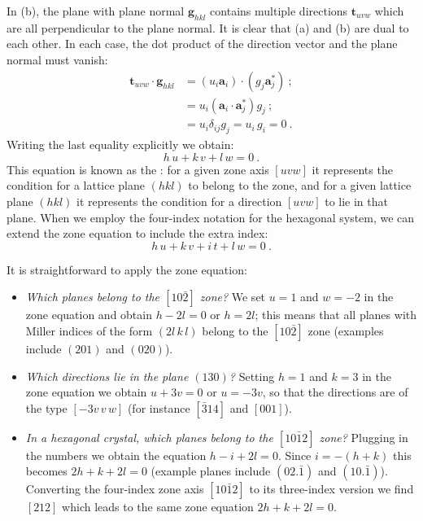 In (b), the plane with plane normal $\mathbf{g}_{hkl}$ contains multiple directions $\mathbf{t}_{uvw}$ which are all perpendicular to the plane normal. It is clear that (a) and (b) are dual to each other.  In each case, the dot product of the direction vector and the plane normal must vanish:
\begin{equation*}
\begin{split}
	\mathbf{t}_{uvw}\cdot\mathbf{g}_{hkl} &= (u_i\mathbf{a}_i)\cdot(g_j\mathbf{a}^{\ast}_j)\ ;\\
	&= u_i(\mathbf{a}_i\cdot\mathbf{a}^{\ast}_j)g_j\ ;\\
	&= u_i\delta_{ij}g_j = u_i\,g_i = 0\ .
\end{split}
\end{equation*}
Writing the last equality explicitly we obtain:
\begin{equation}
	h\,u+k\,v+l\,w=0\ .\label{\chabbr:eq:zoneeq}
\end{equation}
This equation is known as the : for a given zone axis $[uvw]$ it represents the condition for a lattice plane $(hkl)$ to belong to the zone, and for a given lattice plane $(hkl)$ it represents the condition for a direction $[uvw]$ to lie in that plane.  When we employ the four-index notation for the hexagonal system, we can extend the zone equation to include the extra index:
\begin{equation}
	h\,u+k\,v+i\, t + l\,w=0\ .\label{\chabbr:eq:zoneeqhex}
\end{equation}

\noindent It is straightforward to apply the zone equation:
\begin{itemize}
	\item \textit{Which planes belong to the $[10\bar{2}]$ zone?} We set $u=1$ and $w=-2$ in the zone equation and obtain $h-2l=0$ or $h=2l$; this means that all planes with Miller indices of the form $(2l\,k\,l)$ belong to the $[10\bar{2}]$ zone (examples include $(201)$ and $(020)$).
	\item \textit{Which directions lie in the plane $(130)$?} Setting $h=1$ and $k=3$ in the zone equation we obtain $u+3v=0$ or $u=-3v$, so that the directions are of the type $[-3v\,v\,w]$ (for instance $[\bar{3}14]$ and $[001]$).
	\item \textit{In a hexagonal crystal, which planes belong to the $[10\bar{1}2]$ zone?} Plugging in the numbers we obtain the equation $h-i+2l=0$.  Since $i=-(h+k)$ this becomes $2h+k+2l=0$ (example planes include $(02.\bar{1})$ and $(10.\bar{1})$).  Converting the four-index zone axis $[10\bar{1}2]$ to its three-index version we find  $[212]$ which leads to the same zone equation $2h+k+2l=0$.
\end{itemize}

